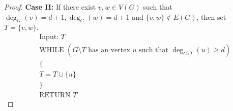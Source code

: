\documentclass[11pt,a4paper,reqno]{amsart}
\theoremstyle{definition}
\numberwithin{equation}{section}
\DeclareMathOperator{\het}{ht}
\begin{document}
\begin{proof}
    
    


    \textbf{Case II:} If there exist $v, w \in V(G)$ such that $ \deg_G(v)=d+1, \deg_G(w) = d+1$ and $\{v, w\} \notin E(G)$, then set $T=\{v,w\}$. 
    \begin{equation} \label{eq:d}
    \begin{split}
        & \text{Input: } T \\
        & \text{WHILE }(G\setminus T \text{ has an vertex } u  \text{ such that } \deg_{G \setminus T}(u) \geq d) \\ 
        & \{ \\       
        & T= T \cup \{u\} \\     
        & \} \\
        & \text{RETURN } T
    \end{split}
\end{equation}
    

\end{proof}
\end{document}
